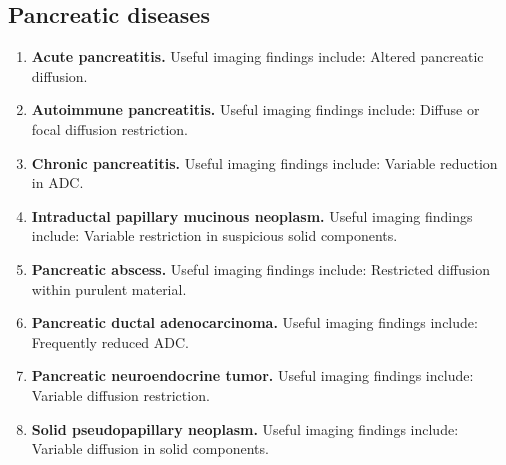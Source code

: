 \subsection{Pancreatic diseases}
\begin{enumerate}[leftmargin=*,itemsep=0.45em,topsep=0.4em]
\item \textbf{Acute pancreatitis.} Useful imaging findings include: Altered pancreatic diffusion.
\item \textbf{Autoimmune pancreatitis.} Useful imaging findings include: Diffuse or focal diffusion restriction.
\item \textbf{Chronic pancreatitis.} Useful imaging findings include: Variable reduction in ADC.
\item \textbf{Intraductal papillary mucinous neoplasm.} Useful imaging findings include: Variable restriction in suspicious solid components.
\item \textbf{Pancreatic abscess.} Useful imaging findings include: Restricted diffusion within purulent material.
\item \textbf{Pancreatic ductal adenocarcinoma.} Useful imaging findings include: Frequently reduced ADC.
\item \textbf{Pancreatic neuroendocrine tumor.} Useful imaging findings include: Variable diffusion restriction.
\item \textbf{Solid pseudopapillary neoplasm.} Useful imaging findings include: Variable diffusion in solid components.
\end{enumerate}

